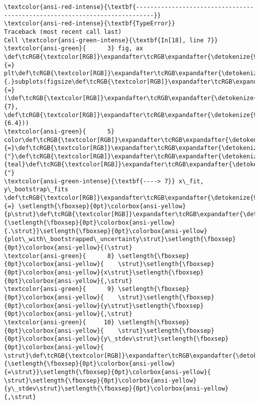 \documentclass[11pt]{article}
\begin{document}
    \begin{Verbatim}[commandchars=\\\{\}, frame=single, framerule=2mm, rulecolor=\color{outerrorbackground}]
\textcolor{ansi-red-intense}{\textbf{---------------------------------------------------------------------------}}
\textcolor{ansi-red-intense}{\textbf{TypeError}}                                 Traceback (most recent call last)
Cell \textcolor{ansi-green-intense}{\textbf{In[18], line 7}}
\textcolor{ansi-green}{      3} fig, ax \def\tcRGB{\textcolor[RGB]}\expandafter\tcRGB\expandafter{\detokenize{98,98,98}}{=} plt\def\tcRGB{\textcolor[RGB]}\expandafter\tcRGB\expandafter{\detokenize{98,98,98}}{.}subplots(figsize\def\tcRGB{\textcolor[RGB]}\expandafter\tcRGB\expandafter{\detokenize{98,98,98}}{=}(\def\tcRGB{\textcolor[RGB]}\expandafter\tcRGB\expandafter{\detokenize{98,98,98}}{7}, \def\tcRGB{\textcolor[RGB]}\expandafter\tcRGB\expandafter{\detokenize{98,98,98}}{6.4}))
\textcolor{ansi-green}{      5} color\def\tcRGB{\textcolor[RGB]}\expandafter\tcRGB\expandafter{\detokenize{98,98,98}}{=}\def\tcRGB{\textcolor[RGB]}\expandafter\tcRGB\expandafter{\detokenize{175,0,0}}{"}\def\tcRGB{\textcolor[RGB]}\expandafter\tcRGB\expandafter{\detokenize{175,0,0}}{teal}\def\tcRGB{\textcolor[RGB]}\expandafter\tcRGB\expandafter{\detokenize{175,0,0}}{"}
\textcolor{ansi-green-intense}{\textbf{----> 7}} x\_fit, y\_bootstrap\_fits \def\tcRGB{\textcolor[RGB]}\expandafter\tcRGB\expandafter{\detokenize{98,98,98}}{=} \setlength{\fboxsep}{0pt}\colorbox{ansi-yellow}{p\strut}\def\tcRGB{\textcolor[RGB]}\expandafter\tcRGB\expandafter{\detokenize{98,98,98}}{\setlength{\fboxsep}{0pt}\colorbox{ansi-yellow}{.\strut}}\setlength{\fboxsep}{0pt}\colorbox{ansi-yellow}{plot\_with\_bootstrapped\_uncertainty\strut}\setlength{\fboxsep}{0pt}\colorbox{ansi-yellow}{(\strut}
\textcolor{ansi-green}{      8} \setlength{\fboxsep}{0pt}\colorbox{ansi-yellow}{    \strut}\setlength{\fboxsep}{0pt}\colorbox{ansi-yellow}{x\strut}\setlength{\fboxsep}{0pt}\colorbox{ansi-yellow}{,\strut}
\textcolor{ansi-green}{      9} \setlength{\fboxsep}{0pt}\colorbox{ansi-yellow}{    \strut}\setlength{\fboxsep}{0pt}\colorbox{ansi-yellow}{y\strut}\setlength{\fboxsep}{0pt}\colorbox{ansi-yellow}{,\strut}
\textcolor{ansi-green}{     10} \setlength{\fboxsep}{0pt}\colorbox{ansi-yellow}{    \strut}\setlength{\fboxsep}{0pt}\colorbox{ansi-yellow}{y\_stdev\strut}\setlength{\fboxsep}{0pt}\colorbox{ansi-yellow}{ \strut}\def\tcRGB{\textcolor[RGB]}\expandafter\tcRGB\expandafter{\detokenize{98,98,98}}{\setlength{\fboxsep}{0pt}\colorbox{ansi-yellow}{=\strut}}\setlength{\fboxsep}{0pt}\colorbox{ansi-yellow}{ \strut}\setlength{\fboxsep}{0pt}\colorbox{ansi-yellow}{y\_stdev\strut}\setlength{\fboxsep}{0pt}\colorbox{ansi-yellow}{,\strut}

\end{Verbatim}
\end{document}
